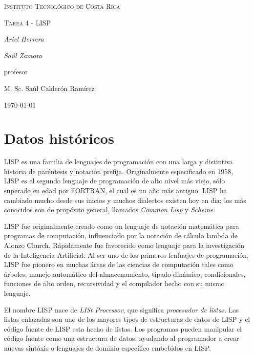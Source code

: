 \documentclass{IEEEtran}
\begin{document}
\begin{titlepage}
  \centering
  {\scshape\LARGE Instituto Tecnol\'ogico de Costa Rica \par}
  \vspace{1cm}
  {\scshape\Large Tarea 4 - LISP\par}
  \vspace{1.5cm}
  {\Large\itshape Ariel Herrera\par}
  {\Large\itshape Sa\'ul Zamora\par}
  \vfill
  profesor\par
  M. Sc. Sa\'ul Calder\'on Ram\'irez \textsc{}

  \vfill

  {\large \today\par}
\end{titlepage}

\section{Datos hist\'oricos}
LISP es una familia de lenguajes de programaci\'on con una larga y distintiva historia de par\'entesis y notaci\'on prefija. Originalmente especificado en 1958, LISP es el segundo lenguaje de programaci\'on de alto nivel m\'as viejo, s\'olo superado en edad por FORTRAN, el cual es un a\~no m\'as antiguo. LISP ha cambiado mucho desde sus inicios y muchos dialectos existen hoy en dia; los m\'as conocidos son de prop\'osito general, llamados \emph{Common Lisp} y \emph{Scheme}.

LISP fue originalmente creado como un lenguaje de notaci\'on matem\'atica para programas de computaci\'on, influenciado por la notaci\'on de c\'alculo lambda de Alonzo Church. R\'apidamente fue favorecido como lenguaje para la investigaci\'on de la Inteligencia Artificial. Al ser uno de los primeros lenfuajes de programaci\'on, LISP fue pionero en muchas \'areas de las ciencias de computaci\'on tales como \'arboles, manejo autom\'atico del almacenamiento, tipado din\'amico, condicionales, funciones de alto orden, recursividad y el compilador hecho con su mismo lenguaje.

El nombre LISP nace de \emph{LISt Processor}, que significa \emph{procesador de listas}. Las listas enlazadas son uno de los mayores tipos de estructuras de datos de LISP y el c\'odigo fuente de LISP esta hecho de listas. Los programas pueden manipular el c\'odigo fuente como una estructura de datos, ayudando al programador a crear nuevas sint\'axis o lenguajes de dominio espec\'ifico embebidos en LISP.
\end{document}
